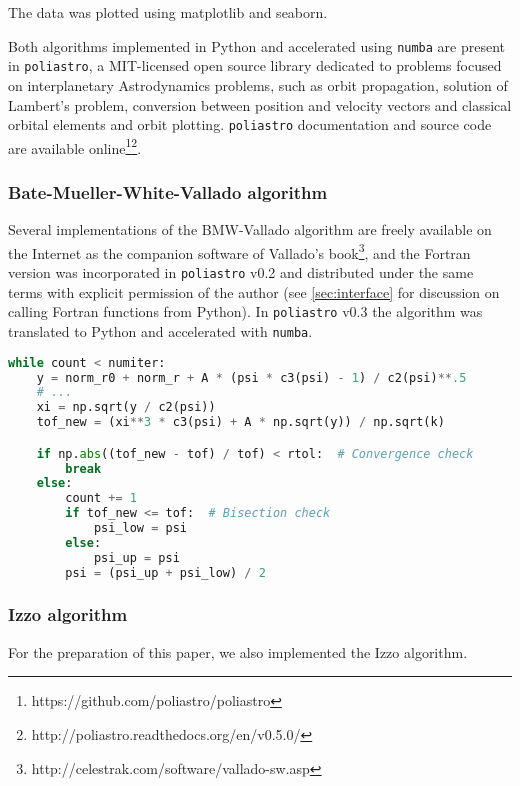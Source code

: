 The data was plotted using matplotlib and seaborn\cite{Droettboom2016}.


Both algorithms implemented in Python and accelerated using \verb|numba| are present in \verb|poliastro|, a MIT-licensed open source library dedicated to problems focused on interplanetary Astrodynamics problems, such as orbit propagation, solution of Lambert's problem, conversion between position and velocity vectors and classical orbital elements and orbit plotting. \verb|poliastro| documentation and source code are available online\footnote{https://github.com/poliastro/poliastro}\footnote{http://poliastro.readthedocs.org/en/v0.5.0/}.

\subsubsection{Bate-Mueller-White-Vallado algorithm}

Several implementations of the BMW-Vallado algorithm are freely available on the Internet as the companion software of Vallado's book\footnote{http://celestrak.com/software/vallado-sw.asp}, and the Fortran version was incorporated in \verb|poliastro| v0.2 and distributed under the same terms with explicit permission of the author (see \ref{sec:interface} for discussion on calling Fortran functions from Python). In \verb|poliastro| v0.3 the algorithm was translated to Python and accelerated with \verb|numba|.

\begin{lstlisting}[language=Python]
while count < numiter:
    y = norm_r0 + norm_r + A * (psi * c3(psi) - 1) / c2(psi)**.5
    # ...
    xi = np.sqrt(y / c2(psi))
    tof_new = (xi**3 * c3(psi) + A * np.sqrt(y)) / np.sqrt(k)

    if np.abs((tof_new - tof) / tof) < rtol:  # Convergence check
        break
    else:
        count += 1
        if tof_new <= tof:  # Bisection check
            psi_low = psi
        else:
            psi_up = psi
        psi = (psi_up + psi_low) / 2
\end{lstlisting}


\subsubsection{Izzo algorithm}

For the preparation of this paper, we also implemented the Izzo algorithm.

